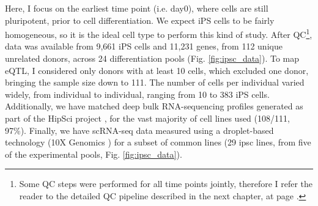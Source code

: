 Here,
I focus on the earliest time point (i.e. day0), where cells are still pluripotent, prior to cell differentiation.
We expect iPS cells to be fairly homogeneous, so it is the ideal cell type to perform this kind of study.
After QC\footnote{Some QC steps were performed for all time points jointly, therefore I refer the reader to the detailed QC pipeline described in the next chapter, at page \pageref{fig:endodiff_qc_workflow}.}, data was available from 9,661 iPS cells and 11,231 genes, from 112 unique unrelated donors, across 24 differentiation pools (Fig. \ref{fig:ipsc_data}). 
To map eQTL, I considered only donors with at least 10 cells, which excluded one donor, bringing the sample size down to 111.
The number of cells per individual varied widely, from individual to individual, ranging from 10 to 383 iPS cells.
Additionally, we have matched deep bulk RNA-sequencing profiles generated as part of the HipSci project \cite{kilpinen2017common}, for the vast majority of cell lines used (108/111, 97\%). 
Finally, we have scRNA-seq data measured using a droplet-based technology (10X Genomics \cite{zheng2017massively}) for a subset of common lines (29 \gls{ipsc} lines, from five of the experimental pools, Fig. \ref{fig:ipsc_data}). 

